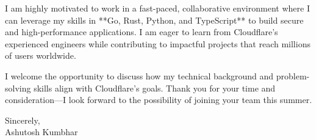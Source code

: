 \documentclass[11pt]{article}
\begin{document}
I am highly motivated to work in a fast-paced, collaborative environment where I can leverage my skills in **Go, Rust, Python, and TypeScript** to build secure and high-performance applications. I am eager to learn from Cloudflare’s experienced engineers while contributing to impactful projects that reach millions of users worldwide.

I welcome the opportunity to discuss how my technical background and problem-solving skills align with Cloudflare’s goals. Thank you for your time and consideration—I look forward to the possibility of joining your team this summer.

Sincerely, \\
Ashutosh Kumbhar
\end{document}
